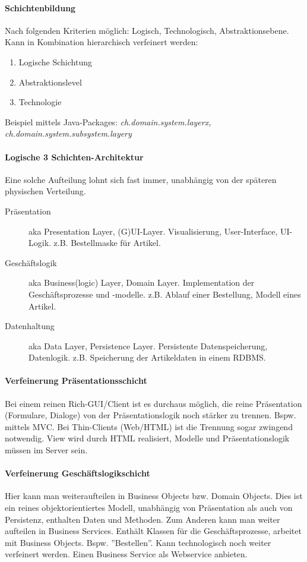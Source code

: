 \paragraph{Schichtenbildung} Nach folgenden Kriterien möglich: Logisch, Technologisch, Abstraktionsebene. Kann in Kombination hierarchisch verfeinert werden:
\begin{enumerate}
	\item Logische Schichtung
	\item Abstraktionslevel
	\item Technologie
\end{enumerate}
	
Beispiel mittels Java-Packages:
\textit{ch.domain.system.layerx, ch.domain.system.subsystem.layery}

\paragraph{Logische 3 Schichten-Architektur} Eine solche Aufteilung lohnt sich fast immer, unabhängig von der späteren physischen Verteilung.
\begin{description}
	\item[Präsentation] aka Presentation Layer, (G)UI-Layer. Visualisierung, User-Interface, UI-Logik. z.B. Bestellmaske für Artikel.
	\item[Geschäftslogik] aka Business(logic) Layer, Domain Layer. Implementation der Geschäftsprozesse und -modelle. z.B. Ablauf einer Bestellung, Modell eines Artikel.
	\item[Datenhaltung] aka Data Layer, Persistence Layer. Persistente Datenspeicherung, Datenlogik. z.B. Speicherung der Artikeldaten in einem RDBMS.
\end{description}

\paragraph{Verfeinerung Präsentationsschicht} Bei einem reinen Rich-GUI/Client ist es durchaus möglich, die reine Präsentation (Formulare, Dialoge) von der Präsentationslogik noch stärker zu trennen. Bspw. mittels MVC. Bei Thin-Clients (Web/HTML) ist die Trennung sogar zwingend notwendig. View wird durch HTML realisiert, Modelle und Präsentationslogik müssen im Server sein.

\paragraph{Verfeinerung Geschäftslogikschicht} Hier kann man weiteraufteilen in Business Objects bzw. Domain Objects. Dies ist ein reines objektorientiertes Modell, unabhängig von Präsentation als auch von Persistenz, enthalten Daten und Methoden. Zum Anderen kann man weiter aufteilen in Business Services. Enthält Klassen für die Geschäftsprozesse, arbeitet mit Business Objects. Bspw. ''Bestellen''. Kann technologisch noch weiter verfeinert werden. Einen Business Service als Webservice anbieten.


